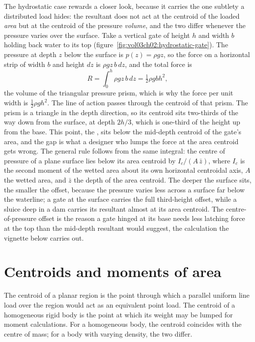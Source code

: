 The hydrostatic case rewards a closer look, because it carries the one
subtlety a distributed load hides: the resultant does not act at the
centroid of the loaded \emph{area} but at the centroid of the pressure
\emph{volume}, and the two differ whenever the pressure varies over the
surface. Take a vertical gate of height $h$ and width $b$ holding back
water to its top (figure~\ref{fig:vol03ch02:hydrostatic-gate}). The
pressure at depth $z$ below the surface is $p(z) = \rho g z$, so the force
on a horizontal strip of width $b$ and height $dz$ is $\rho g z\,b\,dz$,
and the total force is
\[
R = \int_0^h \rho g z\,b\,dz = \tfrac12 \rho g b h^2,
\]
the volume of the triangular pressure prism, which is why the force per
unit width is $\tfrac12\rho g h^2$. The line of action passes through the
centroid of that prism. The prism is a triangle in the depth direction,
so its centroid sits two-thirds of the way down from the surface, at depth
$2h/3$, which is one-third of the height up from the base. This point, the
, sits below the mid-depth centroid of the
gate's area, and the gap is what a designer who lumps the force at the
area centroid gets wrong. The general rule follows from the same integral:
the centre of pressure of a plane surface lies below its area centroid by
$I_c/(A\,\bar{z})$, where $I_c$ is the second moment of the wetted area
about its own horizontal centroidal axis, $A$ the wetted area, and
$\bar{z}$ the depth of the area centroid. The deeper the surface sits, the
smaller the offset, because the pressure varies less across a surface far
below the waterline; a gate at the surface carries the full third-height
offset, while a sluice deep in a dam carries its resultant almost at its
area centroid. The centre-of-pressure offset is the reason a gate hinged
at its base needs less latching force at the top than the mid-depth
resultant would suggest, the calculation the vignette below carries out.



\section{Centroids and moments of area}

The centroid of a planar region is the point through which a
parallel uniform line load over the region would act as an
equivalent point load. The centroid of a homogeneous rigid body is
the point at which its weight may be lumped for moment calculations.
For a homogeneous body, the centroid coincides with the centre of
mass; for a body with varying density, the two differ.

